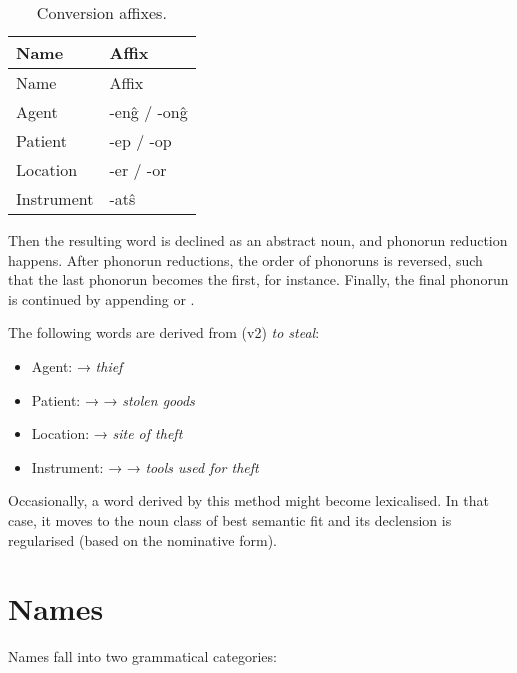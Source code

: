 \documentclass{book}
\begin{document}
\begin{longtable}[c]{|l|>{\kardinal}l|}
    \caption{Conversion affixes.} \\
    
    \hline
    Name & \textnormal{Affix} \\
    \hline
    \endfirsthead
    
    \hline
    Name & \textnormal{Affix} \\
    \hline
    \endhead
    
    \hline
    \endfoot
    
    \hline
    \endlastfoot
    
    Agent & -en\^g / -on\^g \\
    Patient & -ep / -op \\
    Location & -er / -or \\
    Instrument & -at\^s \\
\end{longtable}

Then the resulting word is declined as an abstract noun, and phonorun reduction happens. After phonorun reductions, the order of phonoruns is reversed, such that the last phonorun becomes the first, for instance. Finally, the final phonorun is continued by appending  or .

The following words are derived from  (v2) \emph{to steal}:

\begin{itemize}
    \item Agent:  →  \emph{thief}
    \item Patient:  →  →  \emph{stolen goods}
    \item Location:  →  \emph{site of theft}
    \item Instrument:  →  →  \emph{tools used for theft}
\end{itemize}

Occasionally, a word derived by this method might become lexicalised. In that case, it moves to the noun class of best semantic fit and its declension is regularised (based on the nominative form).

\chapter{Names}

Names fall into two grammatical categories:
\end{document}
